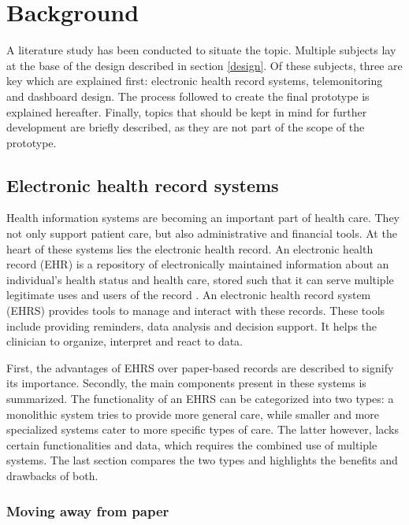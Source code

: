 \section{Background} \label{background}

A literature study has been conducted to situate the topic. Multiple subjects lay at the base of the design described in section \ref{design}. Of these subjects, three are key which are explained first: electronic health record systems, telemonitoring and dashboard design. The process followed to create the final prototype is explained hereafter. Finally, topics that should be kept in mind for further development are briefly described, as they are not part of the scope of the prototype.

    \subsection{Electronic health record systems}

    Health information systems are becoming an important part of health care. They not only support patient care, but also administrative and financial tools. At the heart of these systems lies the electronic health record. An electronic health record (EHR) is a repository of electronically maintained information about an individual's health status and health care, stored such that it can serve multiple legitimate uses and users of the record \cite{biomedical_informatics}. An electronic health record system (EHRS) provides tools to manage and interact with these records. These tools include providing reminders, data analysis and decision support. It helps the clinician to organize, interpret and react to data.

    First, the advantages of EHRS over paper-based records are described to signify its importance. Secondly, the main components present in these systems is summarized. The functionality of an EHRS can be categorized into two types: a monolithic system tries to provide more general care, while smaller and more specialized systems cater to more specific types of care. The latter however, lacks certain functionalities and data, which requires the combined use of multiple systems. The last section compares the two types and highlights the benefits and drawbacks of both.

        \subsubsection{Moving away from paper} \label{2_ehrs_paper}

